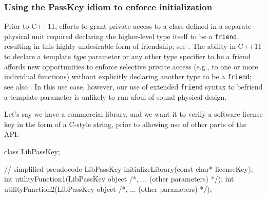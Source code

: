 \subsubsection[Using the \lstinline!PassKey! idiom to enforce initialization]{Using the {\SubsubsecCode PassKey} idiom to enforce initialization}\label{using-the-passkey-idiom-to-enforce-initialization}

Prior to C++11,
efforts to grant private access to a class defined in a separate
physical unit required declaring the higher-level type itself to be a
\lstinline!friend!, resulting in this highly undesirable form of
friendship; see .  
The ability in C++11 to
declare a template \emph{type} parameter or any other type specifier to
be a friend affords new opportunities to enforce selective
private access (e.g., to one or more individual functions) without
explicitly declaring another type to be a \lstinline!friend!; see also . 
In this use case, however, our use of extended
\lstinline!friend! syntax to befriend a template parameter is unlikely to run
afoul of sound physical design.

Let's say we have a commercial library, and we want it to verify a
software-license key in the form of a C-style string, prior to allowing use of 
other parts of the API:


\begin{emcppshiddenlisting}[emcppsbatch=e2]
class LibPassKey;
\end{emcppshiddenlisting}
\begin{emcppslisting}[emcppsbatch=e2]
// simplified pseudocode
LibPassKey initializeLibrary(const char* licenseKey);
int utilityFunction1(LibPassKey object /*, ... (other parameters) */);
int utilityFunction2(LibPassKey object /*, ... (other parameters) */);
\end{emcppslisting}
    
